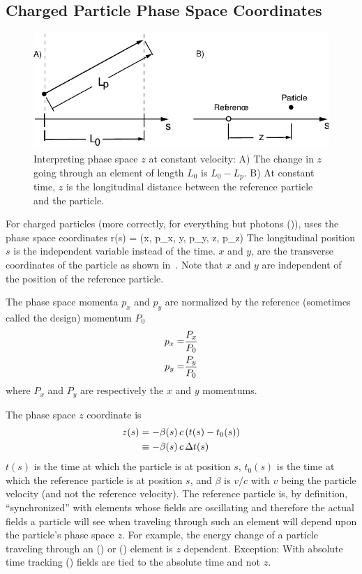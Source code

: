 \subsection{Charged Particle Phase Space Coordinates}
\label{s:phase.space}

\begin{figure}
\centering 
\includegraphics{canonical-z.pdf} 
\caption[Interpreting phase space $z$ at constant velocity.]
{Interpreting phase space $z$ at constant velocity: A) The change in $z$
going through an element of length $L_0$ is $L_0 - L_p$.  B) At
constant time, $z$ is the longitudinal distance between the reference
particle and the particle.}
\label{f:canonical.z}
\end{figure}

For charged particles (more correctly, for everything but photons
()), \bmad uses the phase space coordinates
\Begineq
  \Bf r(s) = (x, p_x, y, p_y, z, p_z)
\Endeq
The longitudinal position $s$ is the independent variable instead of
the time. $x$ and $y$, are the transverse coordinates of the particle
as shown in~. Note that $x$ and $y$ are independent
of the position of the reference particle.

The phase space momenta $p_x$ and $p_y$ are normalized by the
reference (sometimes called the design) momentum $P_0$
\begin{align}
  p_x = &\frac{P_x}{P_0} \nonumber \\
  p_y = &\frac{P_y}{P_0}
  \label{ppp}
\end{align}
where $P_x$ and $P_y$ are respectively the $x$ and $y$ momentums.

The phase space $z$ coordinate is 
\begin{align}
  z(s) &= -\beta(s) \, c \, (t(s) - t_0(s)) \nonumber \\
    &\equiv - \beta(s) \, c \, \Delta t(s)
  \label{zbctt}
\end{align}
$t(s)$ is the time at which the particle is at position $s$, $t_0(s)$
is the time at which the reference particle is at position $s$, and
$\beta$ is $v/c$ with $v$ being the particle velocity (and not the
reference velocity). The reference particle is, by definition,
``synchronized'' with elements whose fields are oscillating and
therefore the actual fields a particle will see when traveling through
such an element will depend upon the particle's phase space $z$. For
example, the energy change of a particle traveling through an
 () or  () element
is $z$ dependent. Exception: With absolute time tracking
() fields are tied to the absolute time and not $z$.

